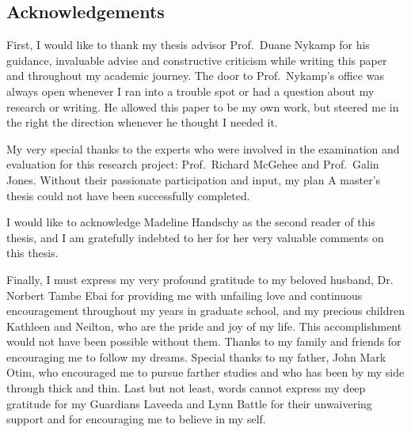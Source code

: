 \thispagestyle{empty}

\begin{center}
    \Large
    
\section*{Acknowledgements}

\end{center}

\vspace{1cm}

First, I would like to thank my thesis advisor Prof.\ Duane Nykamp for  his guidance, invaluable advise and constructive criticism while  writing this paper and throughout my academic journey. The door to Prof.\ Nykamp's office was always open whenever I ran into a trouble spot or had a question about my research or writing. He  allowed this paper to be my own work, but steered me in the right the direction whenever he thought I needed it.


My very special thanks to  the experts who were involved in the examination and evaluation for this research project: Prof.\ Richard McGehee and Prof.\ Galin Jones.  Without their passionate participation and input,  my plan A master's thesis could not have been successfully completed.


I would  like to acknowledge Madeline Handschy as the second reader of this thesis, and I am gratefully indebted to her for her very valuable comments on this thesis.


Finally, I must express my very profound gratitude to my beloved husband, Dr.  Norbert Tambe Ebai  for providing me with unfailing love and continuous encouragement throughout my years in graduate school, and my precious children Kathleen and Neilton, who are the pride and joy of my life. This accomplishment would not have been possible without them.
Thanks to my family and friends for encouraging me to follow my dreams. Special thanks to my father, John Mark Otim, who encouraged me to pursue farther studies and who has been by my side through thick and thin.
Last but not least, words cannot express my deep gratitude for my Guardians Laveeda and Lynn Battle for their
unwaivering support and for encouraging me to believe in my self.






\vfill




\newpage